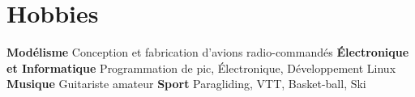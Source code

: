 \documentclass[a4paper]{friggeri-cv} %
\begin{document}

%
%
%
%
%
%




\section{Hobbies}
\textbf{Modélisme} Conception et fabrication d'avions radio-commandés
\textbf{Électronique et Informatique} Programmation de pic, Électronique, Développement Linux
\textbf{Musique} Guitariste amateur
\textbf{Sport} Paragliding, VTT, Basket-ball, Ski
\end{document}
